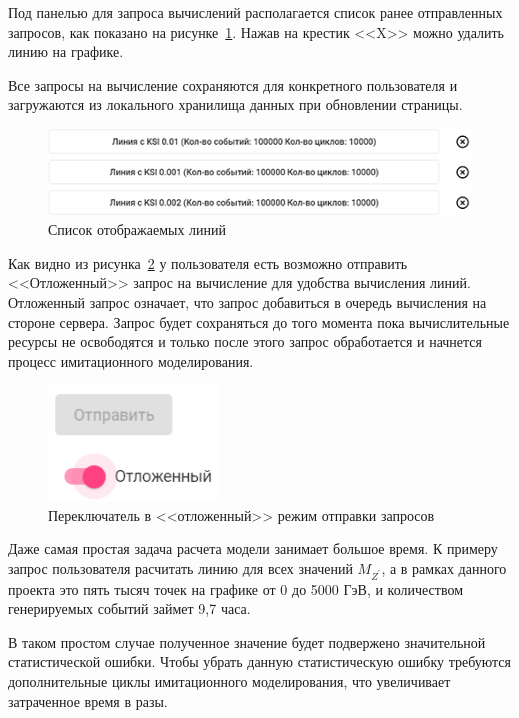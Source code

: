 Под панелью для запроса вычислений располагается список ранее отправленных запросов, как показано на рисунке~\ref{fig:preferences}. Нажав на крестик <<X>> можно удалить линию на графике.

Все запросы на вычисление сохраняются для конкретного пользователя и загружаются из локального хранилища данных при обновлении страницы.

\begin{figure}[!h]
	\centering
	\includegraphics[width=\textwidth]{figures/preferences.png}
	\caption{Список отображаемых линий}
	\label{fig:preferences}
\end{figure}

Как видно из рисунка~\ref{fig:offline-calc} у пользователя есть возможно отправить <<Отложенный>> запрос на вычисление для удобства вычисления линий. Отложенный запрос означает, что запрос добавиться в очередь вычисления на стороне сервера. Запрос будет сохраняться до того момента пока вычислительные ресурсы не освободятся и только после этого запрос обработается и начнется процесс имитационного моделирования.

\begin{figure}[!h]
	\centering
	\includegraphics[width=0.4\textwidth]{figures/offline-calc.png}
	\caption{Переключатель в <<отложенный>> режим отправки запросов}
	\label{fig:offline-calc}
\end{figure}

Даже самая простая задача расчета модели занимает большое время. К примеру запрос пользователя расчитать линию для всех значений ${M}_{{Z}^{\prime}}$, а в рамках данного проекта это пять тысяч точек на графике от 0 до 5000 ГэВ, и количеством генерируемых событий займет 9,7 часа. 

В таком простом случае полученное значение будет подвержено значительной статистической ошибки. Чтобы убрать данную статистическую ошибку требуются дополнительные циклы имитационного моделирования, что увеличивает затраченное время в разы. 

